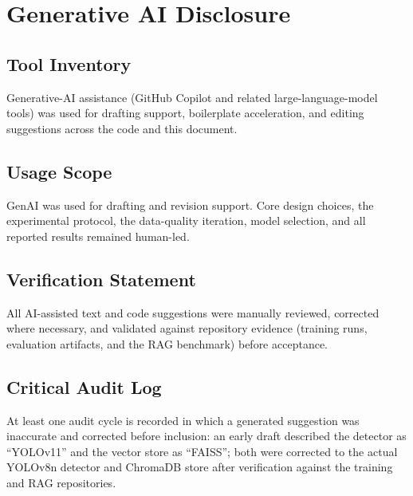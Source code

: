 \chapter{Generative AI Disclosure}

\section{Tool Inventory}
Generative-AI assistance (GitHub Copilot and related large-language-model tools) was
used for drafting support, boilerplate acceleration, and editing suggestions across the
code and this document.

\section{Usage Scope}
GenAI was used for drafting and revision support. Core design choices, the experimental
protocol, the data-quality iteration, model selection, and all reported results remained
human-led.

\section{Verification Statement}
All AI-assisted text and code suggestions were manually reviewed, corrected where
necessary, and validated against repository evidence (training runs, evaluation
artifacts, and the RAG benchmark) before acceptance.

\section{Critical Audit Log}
At least one audit cycle is recorded in which a generated suggestion was inaccurate and
corrected before inclusion: an early draft described the detector as ``YOLOv11'' and the
vector store as ``FAISS''; both were corrected to the actual YOLOv8n detector and
ChromaDB store after verification against the training and RAG repositories.
